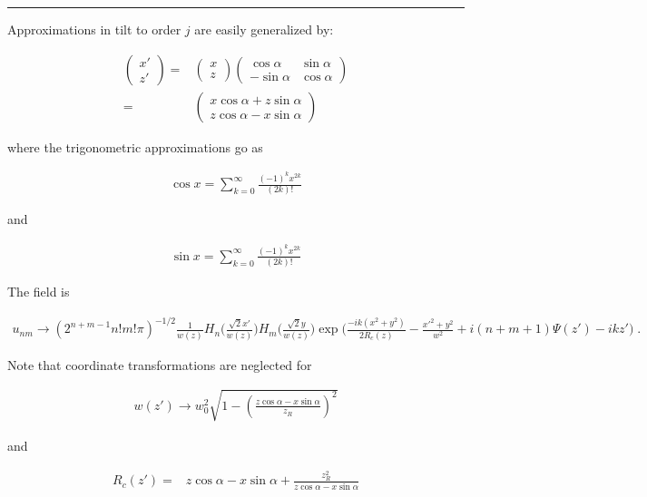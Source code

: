 \documentclass[aps,twoside,secnumarabic,balancelastpage,amsmath,amssymb,nofootinbib,hyperref=pdftex]{revtex4}
\begin{document}
\clearpage

\rule{\textwidth}{0.4pt}
Approximations in tilt to order $j$ are easily generalized by:

\begin{align*}
\begin{pmatrix}
x' \\
z'
\end{pmatrix} 
=&
\begin{pmatrix}
x \\
z
\end{pmatrix} 
\begin{pmatrix}
\cos\alpha & \sin\alpha \\
-\sin\alpha & \cos\alpha
\end{pmatrix}
\\ = &
	\begin{pmatrix}
x\cos \alpha+z \sin \alpha \\
z\cos \alpha - x \sin \alpha
\end{pmatrix}
\end{align*}

where the trigonometric approximations go as

\begin{align*}
	\cos x = \sum_{k=0}^{\infty} \frac{(-1)^kx^{2k} }{(2k)!}
\end{align*}

and

\begin{align*}
	\sin x = \sum_{k=0}^{\infty} \frac{(-1)^kx^{2k} }{(2k)!}
\end{align*}

The field is 

\begin{align*}
	u_{nm} \rightarrow
		(2^{n+m-1}n!m!\pi)^{-1/2}
		\frac{1}{w(z)}
		H_{n} \Big(\frac{\sqrt{2}x'}{w(z)} \Big)
		H_{m} \Big(\frac{\sqrt{2}y}{w(z)} \Big)
		\exp \Big(\frac{-ik(x^{2}+y^{2})}{2R_{c}(z)}-
		\frac{x'^{2}+y^{2}}{w^{2}} 
		+i(n+m+1)\Psi(z') - ikz'		
		\Big)\;
		.
\end{align*}

Note that coordinate transformations are neglected for 

\begin{align*}
	w(z') \rightarrow 
	w_0^2
	\sqrt{1-(
	\frac{z \cos \alpha - x \sin \alpha}
	{z_R} )^2}
\end{align*}

and

\begin{align*}
	R_c(z')
 =&
  z \cos \alpha- x\sin \alpha + \frac{z_R^2}{z \cos \alpha - x \sin \alpha}
\end{align*}
\end{document}
